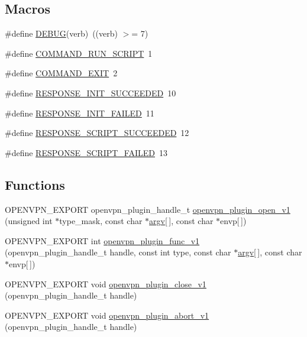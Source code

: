 \subsection*{Macros}
\begin{DoxyCompactItemize}
\item 
\#define \hyperlink{down-root_8c_ae4f3a0b12dc80d88d6d981fcb3cd5979}{D\+E\+B\+U\+G}(verb)~((verb) $>$= 7)
\item 
\#define \hyperlink{down-root_8c_a108a6cd1db8dec189d514272b58e548e}{C\+O\+M\+M\+A\+N\+D\+\_\+\+R\+U\+N\+\_\+\+S\+C\+R\+I\+P\+T}~1
\item 
\#define \hyperlink{down-root_8c_abf1cea64e3b64a73512229f7e8d7ce76}{C\+O\+M\+M\+A\+N\+D\+\_\+\+E\+X\+I\+T}~2
\item 
\#define \hyperlink{down-root_8c_a6b557aae80cbe59c47433a0516b2cae5}{R\+E\+S\+P\+O\+N\+S\+E\+\_\+\+I\+N\+I\+T\+\_\+\+S\+U\+C\+C\+E\+E\+D\+E\+D}~10
\item 
\#define \hyperlink{down-root_8c_a9328d232099241e151d520f002d559de}{R\+E\+S\+P\+O\+N\+S\+E\+\_\+\+I\+N\+I\+T\+\_\+\+F\+A\+I\+L\+E\+D}~11
\item 
\#define \hyperlink{down-root_8c_a74a62f8ab72e7e9fbff3b24c8dfdc309}{R\+E\+S\+P\+O\+N\+S\+E\+\_\+\+S\+C\+R\+I\+P\+T\+\_\+\+S\+U\+C\+C\+E\+E\+D\+E\+D}~12
\item 
\#define \hyperlink{down-root_8c_a2be2a03305afaeda936fb62a396c26b9}{R\+E\+S\+P\+O\+N\+S\+E\+\_\+\+S\+C\+R\+I\+P\+T\+\_\+\+F\+A\+I\+L\+E\+D}~13
\end{DoxyCompactItemize}
\subsection*{Functions}
\begin{DoxyCompactItemize}
\item 
O\+P\+E\+N\+V\+P\+N\+\_\+\+E\+X\+P\+O\+R\+T openvpn\+\_\+plugin\+\_\+handle\+\_\+t \hyperlink{down-root_8c_a86663289a04285e6d64b28d7b128ee30}{openvpn\+\_\+plugin\+\_\+open\+\_\+v1} (unsigned int $\ast$type\+\_\+mask, const char $\ast$\hyperlink{structargv}{argv}\mbox{[}$\,$\mbox{]}, const char $\ast$envp\mbox{[}$\,$\mbox{]})
\item 
O\+P\+E\+N\+V\+P\+N\+\_\+\+E\+X\+P\+O\+R\+T int \hyperlink{down-root_8c_a035baa3834038991bf6c493be0f1e774}{openvpn\+\_\+plugin\+\_\+func\+\_\+v1} (openvpn\+\_\+plugin\+\_\+handle\+\_\+t handle, const int type, const char $\ast$\hyperlink{structargv}{argv}\mbox{[}$\,$\mbox{]}, const char $\ast$envp\mbox{[}$\,$\mbox{]})
\item 
O\+P\+E\+N\+V\+P\+N\+\_\+\+E\+X\+P\+O\+R\+T void \hyperlink{down-root_8c_a09d524ab6e25324d37681b49d0b7abcc}{openvpn\+\_\+plugin\+\_\+close\+\_\+v1} (openvpn\+\_\+plugin\+\_\+handle\+\_\+t handle)
\item 
O\+P\+E\+N\+V\+P\+N\+\_\+\+E\+X\+P\+O\+R\+T void \hyperlink{down-root_8c_aa1dfa775aa39a416f5dd7e18205b7f6f}{openvpn\+\_\+plugin\+\_\+abort\+\_\+v1} (openvpn\+\_\+plugin\+\_\+handle\+\_\+t handle)
\end{DoxyCompactItemize}


